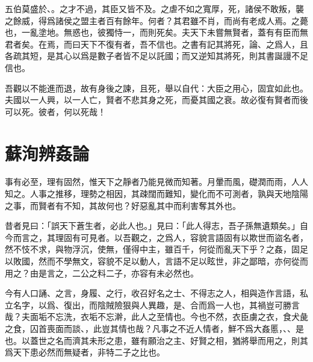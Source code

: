 五伯莫盛於、。之才不過，其臣又皆不及。之虐不如之寬厚，死，諸侯不敢叛，襲之餘威，得爲諸侯之盟主者百有餘年。何者？其君雖不肖，而尚有老成人焉。之薨也，一亂塗地。無惑也，彼獨恃一，而則死矣。夫天下未嘗無賢者，蓋有有臣而無君者矣。在焉，而曰天下不復有者，吾不信也。之書有記其將死，論、之爲人，且各疏其短，是其心以爲是數子者皆不足以託國；而又逆知其將死，則其書誕謾不足信也。

吾觀以不能進而退，故有身後之諫，且死，舉以自代：大臣之用心，固宜如此也。夫國以一人興，以一人亡，賢者不悲其身之死，而憂其國之衰。故必復有賢者而後可以死。彼者，何以死哉！

\theendnotes

\section[辨姦論\quad{\small 蘇洵}]{{\normalsize 蘇洵}\quad 辨姦論}
事有必至，理有固然，惟天下之靜者乃能見微而知著。月暈而風，礎潤而雨，人人知之。人事之推移，理勢之相因，其疎闊而難知，變化而不可測者，孰與天地陰陽之事，而賢者有不知，其故何也？好惡亂其中而利害奪其外也。

昔者見曰：「誤天下蒼生者，必此人也。」見曰：「此人得志，吾子孫無遺類矣。」自今而言之，其理固有可見者。以吾觀之，之爲人，容貌言語固有以欺世而盜名者，然不忮不求，與物浮沉，使無，僅得中主，雖百千，何從而亂天下乎？之姦，固足以敗國，然而不學無文，容貌不足以動人，言語不足以眩世，非之鄙暗，亦何從而用之？由是言之，二公之料二子，亦容有未必然也。

今有人口誦、之言，身履、之行，收召好名之士、不得志之人，相與造作言語，私立名字，以爲、復出，而陰賊險狠與人異趣，是、合而爲一人也，其禍豈可勝言哉？夫面垢不忘洗，衣垢不忘澣，此人之至情也。今也不然，衣臣虜之衣，食犬彘之食，囚首喪面而談、，此豈其情也哉？凡事之不近人情者，鮮不爲大姦慝，、、是也。以蓋世之名而濟其未形之患，雖有願治之主、好賢之相，猶將舉而用之，則其爲天下患必然而無疑者，非特二子之比也。

